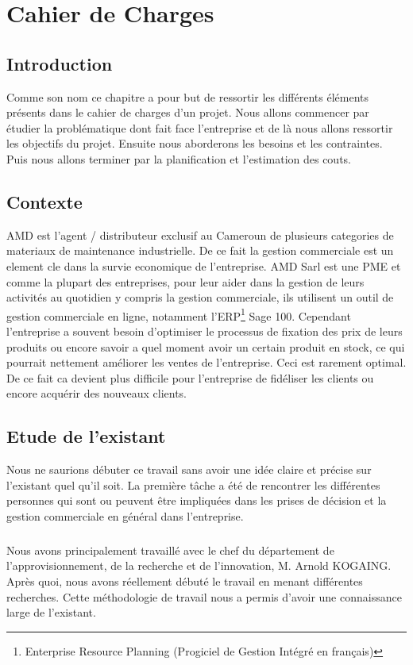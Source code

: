 \chapter{Cahier de Charges}

\section*{Introduction}%
%
Comme son nom ce chapitre a pour but de ressortir les différents éléments présents dans le cahier de charges d’un projet. Nous allons commencer par étudier la problématique dont fait face l’entreprise et de là nous allons ressortir les objectifs du projet. Ensuite nous aborderons les besoins et les contraintes. Puis nous allons terminer par la planification et l'estimation des couts.

\section{Contexte}
AMD est l'agent / distributeur exclusif au Cameroun de plusieurs categories de materiaux de maintenance industrielle. De ce fait la gestion commerciale est un element cle dans la survie economique de l'entreprise. AMD Sarl est une PME et comme la plupart des entreprises, pour leur aider dans la gestion de leurs activités au quotidien y compris la gestion commerciale, ils utilisent un outil de gestion commerciale en ligne, notamment l’ERP\footnote{Enterprise Resource Planning (Progiciel de Gestion Intégré en français)} Sage 100.
Cependant l'entreprise a souvent besoin d'optimiser le processus de fixation des prix de leurs produits ou encore savoir a quel moment avoir un certain produit en stock, ce qui pourrait nettement améliorer les ventes de l'entreprise. Ceci est rarement optimal. De ce fait ca devient plus difficile pour l'entreprise de fidéliser les clients ou encore acquérir des nouveaux clients. 

\section{Etude de l’existant}
Nous ne saurions débuter ce travail sans avoir une idée claire et précise sur l’existant quel qu’il soit. La première tâche a été de rencontrer les différentes personnes qui sont ou peuvent être impliquées dans les prises de décision et la gestion commerciale en général dans l’entreprise. 
\paragraph{}
Nous avons principalement travaillé avec le chef du département de l’approvisionnement, de la recherche et de l’innovation, M. Arnold KOGAING. Après quoi, nous avons réellement débuté le travail en menant différentes recherches. Cette méthodologie de travail nous a permis d’avoir une connaissance large de l’existant.


